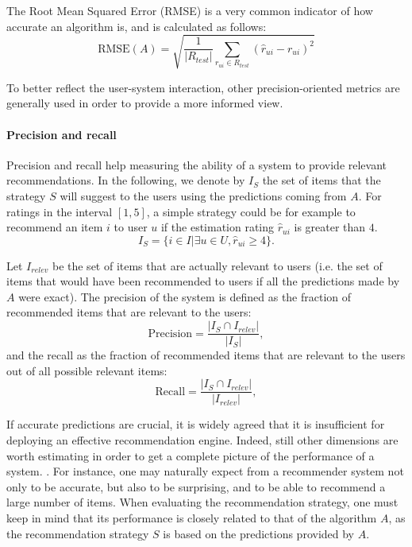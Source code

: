 \documentclass{llncs}
\begin{document}
The Root Mean Squared Error (RMSE) is a very common indicator of how accurate
an algorithm is, and is calculated as follows:
$$\text{RMSE}(A) = \sqrt{\frac{1}{|R_{test}|}\sum_{r_{ui} \in
R_{test}}(\hat{r}_{ui} - r_{ui})^2}$$

To better reflect the user-system interaction, other precision-oriented metrics
are generally used in order to provide a more informed view.

\paragraph{Precision and recall\\}
Precision and recall help measuring the ability of a system to provide
relevant recommendations.
In the following, we denote by $I_{S}$ the set of items that the strategy
$S$ will suggest to the users using the predictions coming from $A$. For
ratings in the interval $[1, 5]$, a simple strategy could be for example to
recommend an item $i$ to user $u$ if the estimation rating $\hat{r}_{ui}$ is
greater than $4$.  $$I_S = \{i \in I | \exists u \in U, \hat{r}_{ui} \geq
4\}.$$

Let $I_{relev}$ be the set of items that are actually relevant to users (i.e.
the set of items that would have been recommended to users if all the
predictions made by $A$ were exact). 
The precision of the system is defined as the fraction of recommended items that
are relevant to the users:
$$\text{Precision} = \frac{|I_{S} \cap I_{relev}|}{|I_{S}|},$$
and the recall as the fraction of recommended items that are relevant to the
users out of all possible relevant items:
$$\text{Recall} = \frac{|I_{S} \cap I_{relev}|}{|I_{relev}|},$$

If accurate predictions are crucial, it is widely agreed that it is
insufficient for deploying an effective recommendation engine. Indeed, still
other dimensions are worth estimating in order to get a complete picture of the
performance of a system.
\cite{NeeRieKonACM2006,HerKonJohTerRieACM2004,KamBriRecSys2014}.
For instance, one may naturally expect from a recommender system
not only to be accurate, but also to be surprising, and to be able to recommend
a large number of items. When evaluating the recommendation strategy, one must
keep in mind that its performance is closely related to that of the algorithm
$A$, as the recommendation strategy $S$ is based on the predictions provided by
$A$.
\end{document}
